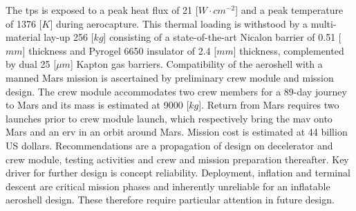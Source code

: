 \newline
\newline
The \acrlong{tps} is exposed to a peak heat flux of 21 [$W \cdot cm^{-2}$] and a peak temperature of 1376 [$K$] during aerocapture. This thermal loading is withstood by a multi-material lay-up 256 [$kg$] consisting of a state-of-the-art Nicalon barrier of 0.51 [$mm$] thickness and Pyrogel 6650 insulator of 2.4 [$mm$] thickness, complemented by dual 25 [$\mu m$] Kapton gas barriers. 
\newline
\newline
Compatibility of the aeroshell with a manned Mars mission is ascertained by preliminary crew module and mission design. The crew module accommodates two crew members for a 89-day journey to Mars and its mass is estimated at 9000 [$kg$]. Return from Mars requires two launches prior to crew module launch, which respectively bring the \acrlong{mav} onto Mars and an \acrlong{erv} in an orbit around Mars. Mission cost is estimated at 44 billion US dollars.
\newline
\newline
Recommendations are a propagation of design on decelerator and crew module, testing activities and crew and mission preparation thereafter. Key driver for further design is concept reliability. Deployment, inflation and terminal descent are critical mission phases and inherently unreliable for an inflatable aeroshell design. These therefore require particular attention in future design.
